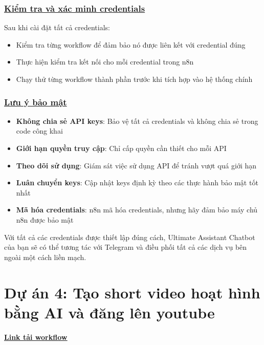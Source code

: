 \subsubsection{\underline{Kiểm tra và xác minh credentials}}
Sau khi cài đặt tất cả credentials:
\begin{itemize}
    \item Kiểm tra từng workflow để đảm bảo nó được liên kết với credential đúng
    \item Thực hiện kiểm tra kết nối cho mỗi credential trong n8n
    \item Chạy thử từng workflow thành phần trước khi tích hợp vào hệ thống chính
\end{itemize}

\subsubsection{\underline{Lưu ý bảo mật}}
\begin{itemize}
    \item \textbf{Không chia sẻ API keys}: Bảo vệ tất cả credentials và không chia sẻ trong code công khai
    \item \textbf{Giới hạn quyền truy cập}: Chỉ cấp quyền cần thiết cho mỗi API
    \item \textbf{Theo dõi sử dụng}: Giám sát việc sử dụng API để tránh vượt quá giới hạn
    \item \textbf{Luân chuyển keys}: Cập nhật keys định kỳ theo các thực hành bảo mật tốt nhất
    \item \textbf{Mã hóa credentials}: n8n mã hóa credentials, nhưng hãy đảm bảo máy chủ n8n được bảo mật
\end{itemize}

Với tất cả các credentials được thiết lập đúng cách, Ultimate Assistant Chatbot của bạn sẽ có thể tương tác với Telegram và điều phối tất cả các dịch vụ bên ngoài một cách liền mạch.

\clearpage
\section{\textbf{Dự án 4: Tạo short video hoạt hình bằng AI và đăng lên youtube }}

\href{https://drive.google.com/file/d/1hBEgM7DZBiMOocM_pxGyne7T97oAKK_B/view?usp=sharing}{\textbf{\underline {Link tải workflow}}}

